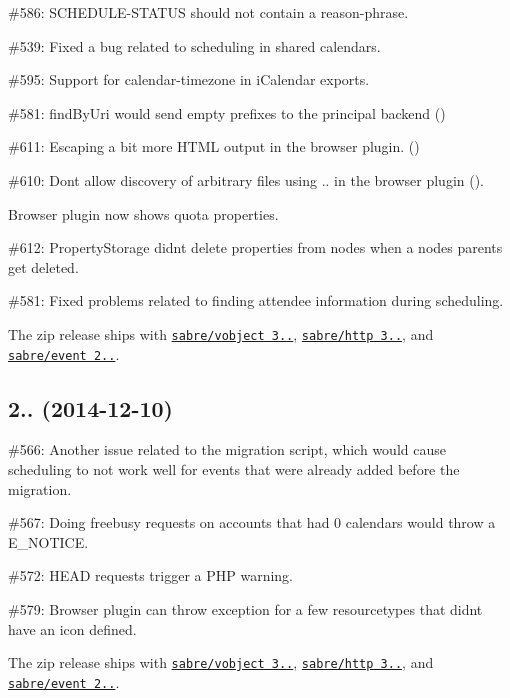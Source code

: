\begin{DoxyItemize}
\item \#586\+: {\ttfamily S\+C\+H\+E\+D\+U\+L\+E-\/\+S\+T\+A\+T\+US} should not contain a reason-\/phrase.
\item \#539\+: Fixed a bug related to scheduling in shared calendars.
\item \#595\+: Support for calendar-\/timezone in i\+Calendar exports.
\item \#581\+: find\+By\+Uri would send empty prefixes to the principal backend ()
\item \#611\+: Escaping a bit more H\+T\+ML output in the browser plugin. ()
\item \#610\+: Don\textquotesingle{}t allow discovery of arbitrary files using {\ttfamily ..} in the browser plugin ().
\item Browser plugin now shows quota properties.
\item \#612\+: Property\+Storage didn\textquotesingle{}t delete properties from nodes when a node\textquotesingle{}s parents get deleted.
\item \#581\+: Fixed problems related to finding attendee information during scheduling.
\item The zip release ships with \href{http://sabre.io/vobject/}{\tt sabre/vobject 3..}, \href{http://sabre.io/http/}{\tt sabre/http 3..}, and \href{http://sabre.io/event/}{\tt sabre/event 2..}.
\end{DoxyItemize}

\subsection*{2.. (2014-\/12-\/10) }


\begin{DoxyItemize}
\item \#566\+: Another issue related to the migration script, which would cause scheduling to not work well for events that were already added before the migration.
\item \#567\+: Doing freebusy requests on accounts that had 0 calendars would throw a {\ttfamily E\+\_\+\+N\+O\+T\+I\+CE}.
\item \#572\+: {\ttfamily H\+E\+AD} requests trigger a P\+HP warning.
\item \#579\+: Browser plugin can throw exception for a few resourcetypes that didn\textquotesingle{}t have an icon defined.
\item The zip release ships with \href{http://sabre.io/vobject/}{\tt sabre/vobject 3..}, \href{http://sabre.io/http/}{\tt sabre/http 3..}, and \href{http://sabre.io/event/}{\tt sabre/event 2..}.
\end{DoxyItemize}

